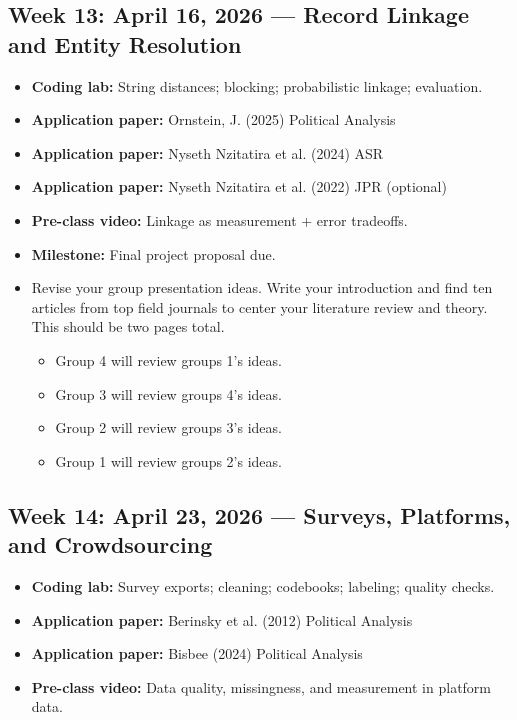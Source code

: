 \documentclass[letterpaper,11pt]{article}
\newcommand{\compresslist}{
\setlength{\itemsep}{1pt}
\setlength{\parskip}{0pt}
\setlength{\parsep}{0pt}
}
\begin{document}
\subsection*{Week 13: April 16, 2026 --- Record Linkage and Entity Resolution}
\begin{itemize}\compresslist
\item \textbf{Coding lab:} String distances; blocking; probabilistic linkage; evaluation.
\item \textbf{Application paper:} Ornstein, J. (2025) Political Analysis
\item \textbf{Application paper:} Nyseth Nzitatira et al. (2024) ASR
\item \textbf{Application paper:} Nyseth Nzitatira et al. (2022) JPR (optional)
\item \textbf{Pre-class video:} Linkage as measurement + error tradeoffs.
\item \textbf{Milestone:} Final project proposal due.
\item Revise your group presentation ideas. Write your introduction and find ten articles from top field journals to center your literature review and theory. This should be two pages total. 
\begin{itemize}
\item Group 4 will review groups 1's ideas.
\item Group 3 will review groups 4's ideas.
\item Group 2 will review groups 3's ideas.
\item Group 1 will review groups 2's ideas.
\end{itemize}
\end{itemize}




\subsection*{Week 14: April 23, 2026 --- Surveys, Platforms, and Crowdsourcing}
\begin{itemize}\compresslist
\item \textbf{Coding lab:} Survey exports; cleaning; codebooks; labeling; quality checks.
\item \textbf{Application paper:} Berinsky et al. (2012) Political Analysis
\item \textbf{Application paper:} Bisbee (2024) Political Analysis
\item \textbf{Pre-class video:} Data quality, missingness, and measurement in platform data.
\end{itemize}
\end{document}
